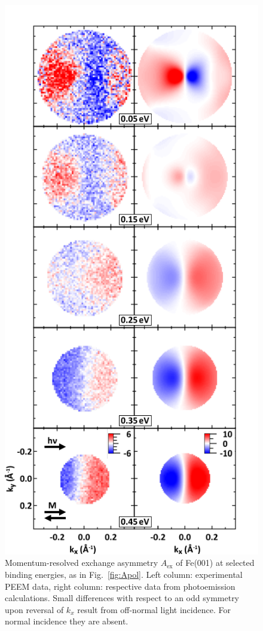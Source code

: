 \documentclass[prl,twocolumn,floatfix,superscriptaddress,aps]{revtex4-2}
\begin{document}
\begin{figure}
    \centering
    \includegraphics[width = 0.7\columnwidth]{FePaperAex.pdf}
    \caption{Momentum-resolved exchange asymmetry $A_{\mathrm{ex}}$ of Fe(001) at selected binding energies, as in Fig.~\ref{fig:Apol}. Left column: experimental PEEM data, right column: respective data from  photoemission calculations. Small differences with respect to an odd symmetry upon reversal of $k_{x}$ result from off-normal light incidence. For normal incidence they are absent.}
    \label{fig:Aex}
\end{figure}
\end{document}
